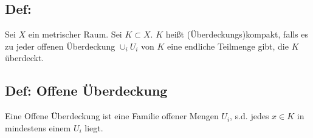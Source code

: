 \subsection{Def: }
Sei $X$ ein metrischer Raum. Sei $K\subset X$. $K$ heißt (Überdeckungs)kompakt, falls es zu jeder offenen Überdeckung $\cup_i U_i$ von $K$ eine endliche Teilmenge gibt, die $K$ überdeckt.

\subsection{Def: Offene Überdeckung}
Eine Offene Überdeckung ist eine Familie offener Mengen $U_i$, s.d. jedes $x\in K$ in mindestens einem $U_i$ liegt.















